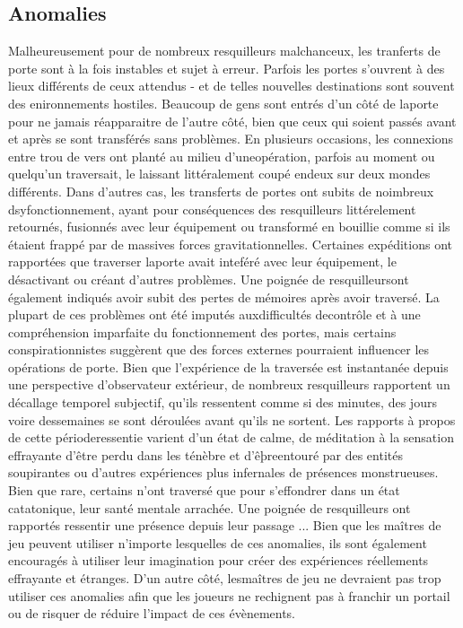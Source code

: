 {\subsection{Anomalies} 

Malheureusement pour de nombreux resquilleurs malchanceux, les tranferts de porte sont à la fois instables et sujet à erreur. Parfois les portes s'ouvrent à des lieux différents de ceux attendus - et de telles nouvelles destinations sont souvent des enironnements hostiles. Beaucoup de gens sont entrés d'un côté de laporte pour ne jamais réapparaitre de l'autre côté, bien que ceux qui soient passés avant et après se sont transférés sans problèmes. En plusieurs occasions, les connexions entre trou de vers ont planté au milieu d'uneopération, parfois au moment ou quelqu'un traversait, le laissant littéralement coupé endeux sur deux mondes différents. Dans d'autres cas, les transferts de portes ont subits de noimbreux dsyfonctionnement, ayant pour conséquences des resquilleurs littérelement retournés, fusionnés avec leur équipement ou transformé en bouillie comme si ils étaient frappé par de massives forces gravitationnelles. Certaines expéditions ont rapportées que traverser laporte avait inteféré avec leur équipement, le désactivant ou créant d'autres problèmes. Une poignée de resquilleursont également indiqués avoir subit des pertes de mémoires après avoir traversé. La plupart de ces problèmes ont été imputés auxdifficultés decontrôle et à une compréhension imparfaite du fonctionnement des portes, mais certains conspirationnistes suggèrent que des forces externes pourraient influencer les opérations de porte. Bien que l'expérience de la traversée est instantanée depuis une perspective d'observateur extérieur, de nombreux resquilleurs rapportent un décallage temporel subjectif, qu'ils ressentent comme si des minutes, des jours voire dessemaines se sont déroulées avant qu'ils ne sortent. Les rapports à propos de cette périoderessentie varient d'un état de calme, de méditation à la sensation effrayante d'être perdu dans les ténèbre et d'êþreentouré par des entités soupirantes ou d'autres expériences plus infernales de présences monstrueuses. Bien que rare, certains n'ont traversé que pour s'effondrer dans un état catatonique, leur santé mentale arrachée. Une poignée de resquilleurs ont rapportés ressentir une présence depuis leur passage ... Bien que les maîtres de jeu peuvent utiliser n'importe lesquelles de ces anomalies, ils sont également encouragés à utiliser leur imagination pour créer des expériences réellements effrayante et étranges. D'un autre côté, lesmaîtres de jeu ne devraient pas trop utiliser ces anomalies afin que les joueurs ne rechignent pas à franchir un portail ou de risquer de réduire l'impact de ces évènements. 

}
